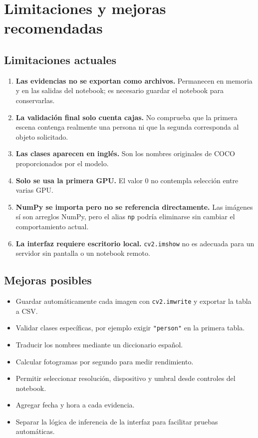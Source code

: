 \documentclass[11pt,a4paper]{article}
\begin{document}
\section{Limitaciones y mejoras recomendadas}

\subsection{Limitaciones actuales}

\begin{enumerate}
  \item \textbf{Las evidencias no se exportan como archivos.} Permanecen en
  memoria y en las salidas del notebook; es necesario guardar el notebook para
  conservarlas.
  \item \textbf{La validación final solo cuenta cajas.} No comprueba que la
  primera escena contenga realmente una persona ni que la segunda corresponda
  al objeto solicitado.
  \item \textbf{Las clases aparecen en inglés.} Son los nombres originales de
  COCO proporcionados por el modelo.
  \item \textbf{Solo se usa la primera GPU.} El valor 0 no contempla selección
  entre varias GPU.
  \item \textbf{NumPy se importa pero no se referencia directamente.} Las
  imágenes sí son arreglos NumPy, pero el alias \texttt{np} podría eliminarse
  sin cambiar el comportamiento actual.
  \item \textbf{La interfaz requiere escritorio local.}
  \texttt{cv2.imshow} no es adecuada para un servidor sin pantalla o un
  notebook remoto.
\end{enumerate}

\subsection{Mejoras posibles}

\begin{itemize}
  \item Guardar automáticamente cada imagen con
  \texttt{cv2.imwrite} y exportar la tabla a CSV.
  \item Validar clases específicas, por ejemplo exigir
  \texttt{"person"} en la primera tabla.
  \item Traducir los nombres mediante un diccionario español.
  \item Calcular fotogramas por segundo para medir rendimiento.
  \item Permitir seleccionar resolución, dispositivo y umbral desde controles
  del notebook.
  \item Agregar fecha y hora a cada evidencia.
  \item Separar la lógica de inferencia de la interfaz para facilitar pruebas
  automáticas.
\end{itemize}
\end{document}
